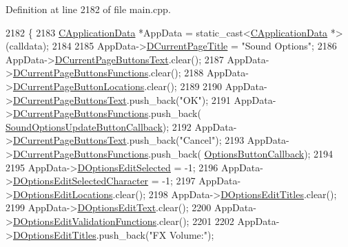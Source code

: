 Definition at line 2182 of file main.\+cpp.


\begin{DoxyCode}
2182                                                                \{
2183     \hyperlink{classCApplicationData}{CApplicationData} *AppData = \textcolor{keyword}{static\_cast<}\hyperlink{classCApplicationData}{CApplicationData} *\textcolor{keyword}{>}(calldata);
2184     
2185     AppData->\hyperlink{classCApplicationData_a49ce7f0b5891f0f2c29b73aad636b761}{DCurrentPageTitle} = \textcolor{stringliteral}{"Sound Options"};
2186     AppData->\hyperlink{classCApplicationData_af04b7f5f8ba4e5c99c0a3530055fc15d}{DCurrentPageButtonsText}.clear();
2187     AppData->\hyperlink{classCApplicationData_ad3079e5563a19d21c1e4ceff2a188382}{DCurrentPageButtonsFunctions}.clear();
2188     AppData->\hyperlink{classCApplicationData_a3615df8e23cea3ce17f11cf61340a7b4}{DCurrentPageButtonLocations}.clear();
2189     
2190     AppData->\hyperlink{classCApplicationData_af04b7f5f8ba4e5c99c0a3530055fc15d}{DCurrentPageButtonsText}.push\_back(\textcolor{stringliteral}{"OK"});
2191     AppData->\hyperlink{classCApplicationData_ad3079e5563a19d21c1e4ceff2a188382}{DCurrentPageButtonsFunctions}.push\_back(
      \hyperlink{classCApplicationData_ae63c8ca19ddeb92a3aaf0a5d67d09e58}{SoundOptionsUpdateButtonCallback});
2192     AppData->\hyperlink{classCApplicationData_af04b7f5f8ba4e5c99c0a3530055fc15d}{DCurrentPageButtonsText}.push\_back(\textcolor{stringliteral}{"Cancel"});
2193     AppData->\hyperlink{classCApplicationData_ad3079e5563a19d21c1e4ceff2a188382}{DCurrentPageButtonsFunctions}.push\_back(
      \hyperlink{classCApplicationData_a3647cf78eb59689b901d4204c81555b4}{OptionsButtonCallback});
2194     
2195     AppData->\hyperlink{classCApplicationData_aee4aa5eb5b89b86eb2648d0f9c7358f9}{DOptionsEditSelected} = -1;
2196     AppData->\hyperlink{classCApplicationData_a921d69021fc61e51d12d8a26a5ac1a89}{DOptionsEditSelectedCharacter} = -1;
2197     AppData->\hyperlink{classCApplicationData_ab4e6804c6e50cca45ab3c3071588da34}{DOptionsEditLocations}.clear();
2198     AppData->\hyperlink{classCApplicationData_a7a322ef6b8c1db3e995c6b493230fd05}{DOptionsEditTitles}.clear();
2199     AppData->\hyperlink{classCApplicationData_a7044dc34cbd9d6776e8ef79eb12b5ce4}{DOptionsEditText}.clear();
2200     AppData->\hyperlink{classCApplicationData_ab76fa444142de66fdb058f390e01112c}{DOptionsEditValidationFunctions}.clear();
2201     
2202     AppData->\hyperlink{classCApplicationData_a7a322ef6b8c1db3e995c6b493230fd05}{DOptionsEditTitles}.push\_back(\textcolor{stringliteral}{"FX Volume:"});

\end{DoxyCode}
